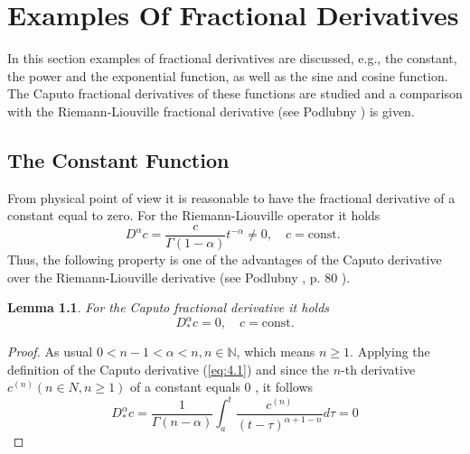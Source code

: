 \documentclass[a4paper,14pt,oneside]{book}
\theoremstyle{plain}
\newtheorem{lem}[thm]{Lemma}
\theoremstyle{definition}
\theoremstyle{remark}
\begin{document}
\begin{landscape}
\begin{center}
\begin{tabular}{|c|c|c|}
        \end{tabular}
        \end{center}
    \end{landscape}

\chapter{Examples Of Fractional Derivatives}
\begin{center}
\begin{flushleft} 
\justify
\Large{
In this section examples of fractional derivatives are discussed, e.g., the constant, the power and the exponential function, as well as the sine and cosine function. The Caputo fractional derivatives of these functions are studied and a comparison with the Riemann-Liouville fractional derivative (see Podlubny \cite{bb22}) is given.

\section{The Constant Function}
From physical point of view it is reasonable to have the fractional derivative of a constant equal to zero. For the Riemann-Liouville operator it holds
$$
D^{\alpha} c=\frac{c}{\Gamma(1-\alpha)} t^{-\alpha} \neq 0, \quad c=\text{const. }
$$
Thus, the following property is one of the advantages of the Caputo derivative over the Riemann-Liouville derivative (see Podlubny \cite{bb22}, p. 80 ).
\begin{lem}
For the Caputo fractional derivative it holds
$$
D_{*}^{\alpha} c=0, \quad c=\text{const.}
$$
\end{lem}
\begin{proof}
As usual $0<n-1<\alpha<n, n \in \mathbb{N}$, which means $n \geq 1$. Applying the definition of the Caputo derivative (\ref{eq:4.1}) and since the $n$-th derivative $c^{(n)}(n \in N, n \geq 1)$ of a constant equals 0 , it follows
$$
D_{*}^{\alpha} c=\frac{1}{\Gamma(n-\alpha)} \int_{a}^{t} \frac{c^{(n)}}{(t-\tau)^{\alpha+1-n}} d \tau=0
$$
\end{proof}

}
\end{flushleft}
\end{center}
\end{document}
